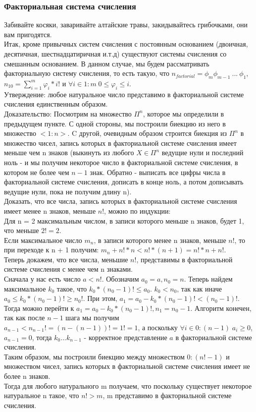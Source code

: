 \subsubsection{Факториальная система счисления}
Забивайте косяки, заваривайте алтайские травы, закидывайтесь грибочками, они вам пригодятся.\\
Итак, кроме привычных систем счисления с постоянным основанием (двоичная, десятичная, шестнадцатиричная и.т.д) существуют системы счисления со смешанным основанием. В данном случае, мы будем рассматривать факториальную систему счисления, то есть такую, что $n_{factorial} = \phi_m\phi_{m - 1}\:...\:\phi_1$, $n_{10} = \sum\limits_{i = 1}^{m}{\varphi_i * i!}$ и $\forall i \in 1:m \; 0 \leq \varphi_i \leq i$.\\
Утверждение: любое натуральное число представимо в факториальной системе счисления единственным образом.\\
Доказательство: Посмотрим на множество $\Pi^n$, которое мы определили в предыдущем пункте. С одной стороны, мы построили биекцию из него в множество $<1:n>$. C другой, очевидным образом строится биекция из $\Pi^n$ в множество чисел, запись которых в факториальной системе счисления имеет меньше чем n знаков (выкинуть из любого $X \in \Pi^n$ ведущие нули и последний ноль - и мы получим некоторое число в факториальной системе счисления, в котором не более чем $n - 1$ знак. Обратно - выписать все цифры числа в факториальной системе счисления, дописать в конце ноль, а потом дописывать ведущие нули, пока не получим длину n). \\
Доказать, что все числа, запись которых в факториальной системе счисления имеет менее n знаков, меньше $n!$, можно по индукции: \\
Для n = 2 максимальным числом,  в записи которого меньше n знаков, будет 1, что меньше $2! = 2$.\\
Если максимальное число $m_n$, в записи которого менее n знаков, меньше $n!$, то при переходе к n + 1 получим: $m_n + n! * n < n! * (n + 1) = n! * n + n!$.\\
Теперь докажем, что все числа, меньшие $n!$, представимы в факториальной системе счисления с менее чем n знаками.\\
Сначала у нас есть число $a < n!$. Обозначим $a_0 = a, n_0 = n$. Теперь найдем максимальное $k_0$ такое, что $k_0 * (n_0 - 1)! \leq a_0$. $k_0 < n_0$, так как иначе $a_0 \leq k_0 * (n_0 - 1)! \geq n_0!$. При этом, $a_1 = a_0 - k_0 * (n_0 - 1)! < (n_0 - 1)!$. Тогда можно перейти к $a_1 = a_0 - k_0 * (n_0 - 1)!, n_1 = n_0 - 1$. Алгоритм конечен, так как после $n - 1$ шага мы получим $a_{n - 1} < n_{n - 1}! = (n - (n - 1))! = 1! = 1$, а поскольку $\forall i \in 0:(n - 1) \; a_i \geq 0$, $a_{n - 1} = 0$, тогда $k_0...k_{n - 1}$ - корректное представление $a$ в факториальной системе счисления.\\
Таким образом, мы построили биекцию между множеством $0:(n! - 1)$ и множеством чисел, запись которых в факториальной системе счисления имеет не более n знаков.\\
Тогда для любого натурального m получаем, что поскольку существует некоторое натуральное n такое, что $n! > m$, m представимо в факториальной системе счисления. 
